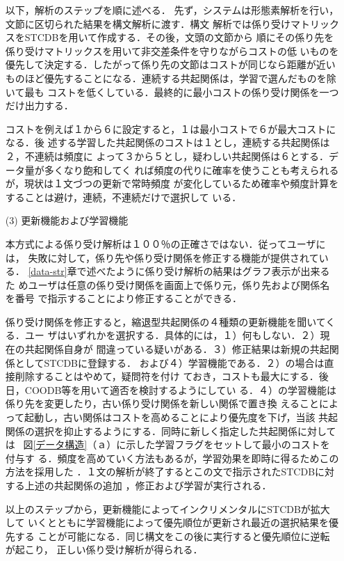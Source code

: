 \begin{itemize}
以下，解析のステップを順に述べる．
先ず，システムは形態素解析を行い，文節に区切られた結果を構文解析に渡す．構文
解析では係り受けマトリックスをSTCDBを用いて作成する．その後，文頭の文節から
順にその係り先を係り受けマトリックスを用いて非交差条件を守りながらコストの低
いものを優先して決定する．したがって係り先の文節はコストが同じなら距離が近い
ものほど優先することになる．連続する共起関係は，学習で選んだものを除いて最も
コストを低くしている．最終的に最小コストの係り受け関係を一つだけ出力する．

コストを例えば１から６に設定すると，１は最小コストで６が最大コストになる．後
述する学習した共起関係のコストは１とし，連続する共起関係は２，不連続は頻度に
よって３から５とし，疑わしい共起関係は６とする．データ量が多くなり飽和してく
れば頻度の代りに確率を使うことも考えられるが，現状は１文づつの更新で常時頻度
が変化しているため確率や頻度計算をすることは避け，連続，不連続だけで選択して
いる．

\item[(3)]更新機能および学習機能

本方式による係り受け解析は１００％の正確さではない．従ってユーザには，
失敗に対して，係り先や係り受け関係を修正する機能が提供されている．
\ref{data-str}章で述べたように係り受け解析の結果はグラフ表示が出来るた
めユーザは任意の係り受け関係を画面上で係り元，係り先および関係名を番号
で指示することにより修正することができる．

係り受け関係を修正すると，縮退型共起関係の４種類の更新機能を聞いてくる．ユー
ザはいずれかを選択する．具体的には，１）何もしない．２）現在の共起関係自身が
間違っている疑いがある．３）修正結果は新規の共起関係としてSTCDBに登録する．
および４）学習機能である．２）の場合は直接削除することはやめて，疑問符を付け
ておき，コストも最大にする．後日，COODB等を用いて適否を検討するようにしてい
る．４）の学習機能は係り先を変更したり，古い係り受け関係を新しい関係で置き換
えることによって起動し，古い関係はコストを高めることにより優先度を下げ，当該
共起関係の選択を抑止するようにする．同時に新しく指定した共起関係に対しては~
図\ref{データ構造}（ａ）に示した学習フラグをセットして最小のコストを付与す
る．頻度を高めていく方法もあるが，学習効果を即時に得るためこの方法を採用した
．１文の解析が終了するとこの文で指示されたSTCDBに対する上述の共起関係の追加
，修正および学習が実行される．

以上のステップから，更新機能によってインクリメンタルにSTCDBが拡大して
いくとともに学習機能によって優先順位が更新され最近の選択結果を優先する
ことが可能になる．同じ構文をこの後に実行すると優先順位に逆転が起こり，
正しい係り受け解析が得られる．


\end{itemize}
